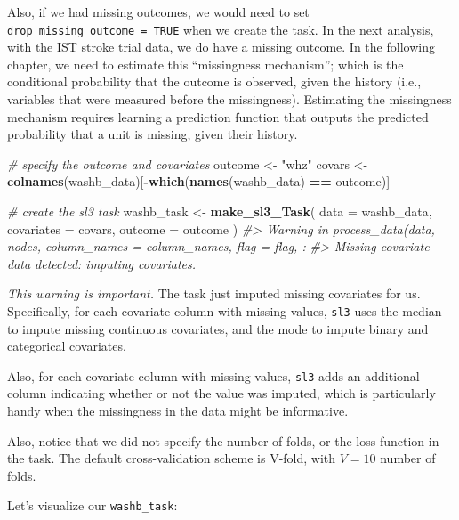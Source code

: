 \documentclass[12pt, krantz2,]{krantz}
\newenvironment{Shaded}{\begin{snugshade}}{\end{snugshade}}
\newcommand{\CommentTok}[1]{\textcolor[rgb]{0.37,0.37,0.37}{\textit{#1}}}
\newcommand{\DataTypeTok}[1]{\textcolor[rgb]{0.27,0.27,0.27}{#1}}
\newcommand{\KeywordTok}[1]{\textcolor[rgb]{0.27,0.27,0.27}{\textbf{#1}}}
\newcommand{\NormalTok}[1]{#1}
\newcommand{\OperatorTok}[1]{\textcolor[rgb]{0.43,0.43,0.43}{\textbf{#1}}}
\newcommand{\StringTok}[1]{\textcolor[rgb]{0.5,0.5,0.5}{#1}}
\theoremstyle{definition}
\theoremstyle{definition}
\theoremstyle{definition}
\newcommand{\1}{\mathbbm{1}}
\begin{document}
Also, if we had missing outcomes, we would need to set \texttt{drop\_missing\_outcome\ =\ TRUE} when we create the task. In the next analysis, with the \protect\hyperlink{ist}{IST stroke trial
data}, we do have a missing outcome. In the following chapter, we need to
estimate this ``missingness mechanism''; which is the conditional probability that
the outcome is observed, given the history (i.e., variables that were measured
before the missingness). Estimating the missingness mechanism requires learning
a prediction function that outputs the predicted probability that a unit is
missing, given their history.

\begin{Shaded}
\begin{Highlighting}[]
\CommentTok{# specify the outcome and covariates}
\NormalTok{outcome <-}\StringTok{ "whz"}
\NormalTok{covars <-}\StringTok{ }\KeywordTok{colnames}\NormalTok{(washb_data)[}\OperatorTok{-}\KeywordTok{which}\NormalTok{(}\KeywordTok{names}\NormalTok{(washb_data) }\OperatorTok{==}\StringTok{ }\NormalTok{outcome)]}

\CommentTok{# create the sl3 task}
\NormalTok{washb_task <-}\StringTok{ }\KeywordTok{make_sl3_Task}\NormalTok{(}
  \DataTypeTok{data =}\NormalTok{ washb_data,}
  \DataTypeTok{covariates =}\NormalTok{ covars,}
  \DataTypeTok{outcome =}\NormalTok{ outcome}
\NormalTok{)}
\CommentTok{#> Warning in process_data(data, nodes, column_names = column_names, flag = flag, :}
\CommentTok{#> Missing covariate data detected: imputing covariates.}
\end{Highlighting}
\end{Shaded}

\emph{This warning is important.} The task just imputed missing covariates for us.
Specifically, for each covariate column with missing values, \texttt{sl3} uses the
median to impute missing continuous covariates, and the mode to impute binary
and categorical covariates.

Also, for each covariate column with missing values, \texttt{sl3} adds an additional
column indicating whether or not the value was imputed, which is particularly
handy when the missingness in the data might be informative.

Also, notice that we did not specify the number of folds, or the loss function
in the task. The default cross-validation scheme is V-fold, with \(V=10\) number
of folds.

Let's visualize our \texttt{washb\_task}:
\end{document}
